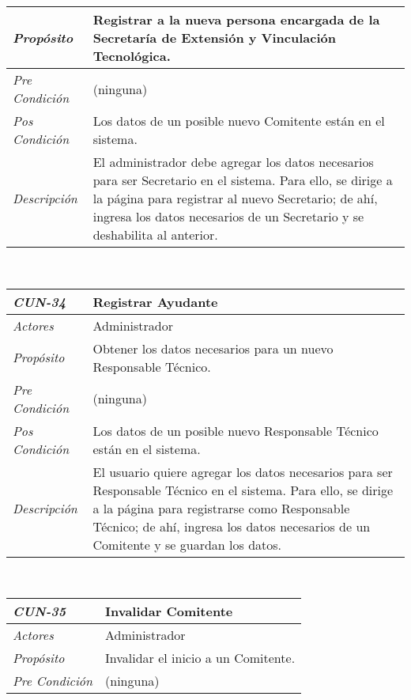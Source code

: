 \begin{center}
{\begin{tabular}{ | p{3cm} | p{12.5cm} | }
	\hline
	\raggedleft \textit{Prop\'osito} & Registrar a la
	nueva persona encargada de la Secretar\'ia de
	Extensi\'on y Vinculaci\'on Tecnol\'ogica. \\
	\hline
	\raggedleft \textit{Pre Condici\'on} & (ninguna) \\
	\hline
	\raggedleft \textit{Pos Condici\'on} & Los datos de
	un posible nuevo Comitente est\'an en el sistema. \\
	\hline
	\raggedleft \textit{Descripci\'on} &
	El administrador debe agregar los datos necesarios para
	ser Secretario en el sistema. Para ello, se dirige a la
	p\'agina para registrar al nuevo Secretario; de ah\'i,
	ingresa los datos necesarios de un Secretario y se
	deshabilita al anterior. \\
	\hline
\end{tabular}} \\[1cm]
\hypertarget{CUN-34}{%
\begin{tabular}{ | p{3cm} | p{12.5cm} | }
	\hline
	\rowcolor{lightgray}
	\hfil \textbf{\textit{CUN-34}} &
	\hfil \textbf{Registrar Ayudante} \\
	\hline
	\raggedleft \textit{Actores} & Administrador \\
	\hline
	\raggedleft \textit{Prop\'osito} & Obtener los
	datos necesarios para un nuevo Responsable
	T\'ecnico. \\
	\hline
	\raggedleft \textit{Pre Condici\'on} & (ninguna) \\
	\hline
	\raggedleft \textit{Pos Condici\'on} & Los datos de
	un posible nuevo Responsable T\'ecnico est\'an en el
	sistema. \\
	\hline
	\raggedleft \textit{Descripci\'on} &
	El usuario quiere agregar los datos necesarios para
	ser Responsable T\'ecnico en el sistema. Para ello,
	se dirige a la p\'agina para registrarse como
	Responsable T\'ecnico; de ah\'i, ingresa los datos
	necesarios de un Comitente y se guardan los datos. \\
	\hline
\end{tabular}} \\[1cm]
\hypertarget{CUN-35}{%
\begin{tabular}{ | p{3cm} | p{12.5cm} | }
	\hline
	\rowcolor{lightgray}
	\hfil \textbf{\textit{CUN-35}} &
	\hfil \textbf{Invalidar Comitente} \\
	\hline
	\raggedleft \textit{Actores} & Administrador \\
	\hline
	\raggedleft \textit{Prop\'osito} & Invalidar el
	inicio a un Comitente. \\
	\hline
	\raggedleft \textit{Pre Condici\'on} & (ninguna) \\

\end{tabular}}
\end{center}
